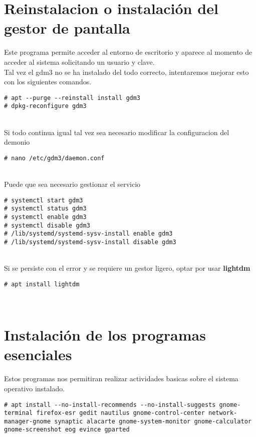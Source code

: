 \section{Reinstalacion o instalación del gestor de pantalla}
Este programa permite acceder al entorno de escritorio y aparece al momento de acceder al sistema solicitando un usuario y clave.\\
Tal vez el gdm3 no se ha instalado del todo correcto, intentaremos mejorar esto con los siguientes comandos.
\begin{verbatim}
# apt --purge --reinstall install gdm3
# dpkg-reconfigure gdm3
\end{verbatim}
\\[1em]
Si todo continua igual tal vez sea necesario modificar la configuracion del demonio
\begin{verbatim}
# nano /etc/gdm3/daemon.conf
\end{verbatim}
\\[1em]
Puede que sea necesario gestionar el servicio
\begin{verbatim}
# systemctl start gdm3
# systemctl status gdm3
# systemctl enable gdm3
# systemctl disable gdm3
# /lib/systemd/systemd-sysv-install enable gdm3
# /lib/systemd/systemd-sysv-install disable gdm3
\end{verbatim}
\\[1em]
Si se persiste con el error y se requiere un gestor ligero, optar por usar \textbf{lightdm}
\begin{verbatim}
# apt install lightdm
\end{verbatim}
\\[1em]

\section{Instalación de los programas esenciales}
Estos programas nos permitiran realizar actividades basicas sobre el sistema operativo instalado.
\begin{verbatim}
# apt install --no-install-recommends --no-install-suggests gnome-terminal firefox-esr gedit nautilus gnome-control-center network-manager-gnome synaptic alacarte gnome-system-monitor gnome-calculator gnome-screenshot eog evince gparted
\end{verbatim}
\\[1em]


